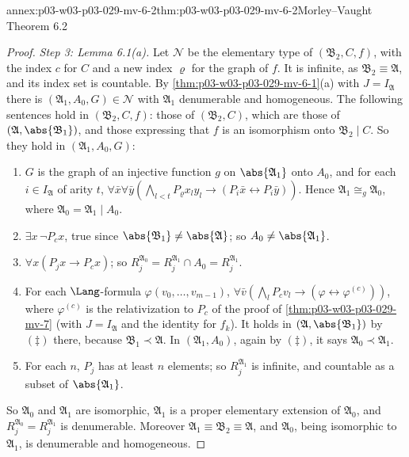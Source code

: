 \begin{annexitem}{annex:p03-w03-p03-029-mv-6-2}{thm:p03-w03-p03-029-mv-6-2}{Morley--Vaught Theorem 6.2}
\begin{proof}
\emph{Step 3: Lemma 6.1(a).} Let \(\mathscr N\) be the elementary type of
\((\mathfrak B_2,C,f)\), with the index \(c\) for \(C\) and a new index
\(\varrho\) for the graph of \(f\). It is infinite, as \(\mathfrak B_2\equiv\mathfrak
A\), and its index set is countable. By
\cref{thm:p03-w03-p03-029-mv-6-1}(a) with \(J=I_{\mathfrak A}\) there is
\((\mathfrak A_1,A_0,G)\in\mathscr N\) with \(\mathfrak A_1\) denumerable
and homogeneous. The following sentences hold in \((\mathfrak B_2,C,f)\):
those of \((\mathfrak B_2,C)\), which are those of \((\mathfrak
A,\abs{\mathfrak B_1})\), and those expressing that \(f\) is an isomorphism
onto \(\mathfrak B_2\mathbin{|}C\). So they hold in \((\mathfrak
A_1,A_0,G)\):
\begin{enumerate}
  \item[(s1)] \(G\) is the graph of an injective function \(g\) on
        \(\abs{\mathfrak A_1}\) onto \(A_0\), and for each \(i\in
        I_{\mathfrak A}\) of arity \(t\),
        \(\forall\bar x\forall\bar y(\bigwedge_{l<t}P_\varrho x_ly_l\to(P_i\bar
        x\leftrightarrow P_i\bar y))\). Hence \(\mathfrak A_1\cong_g\mathfrak
        A_0\), where \(\mathfrak A_0=\mathfrak A_1\mathbin{|}A_0\).
  \item[(s2)] \(\exists x\,\neg P_cx\), true since \(\abs{\mathfrak
        B_1}\neq\abs{\mathfrak A}\); so \(A_0\neq\abs{\mathfrak A_1}\).
  \item[(s3)] \(\forall x(P_jx\to P_cx)\); so \(R_j^{\mathfrak
        A_0}=R_j^{\mathfrak A_1}\cap A_0=R_j^{\mathfrak A_1}\).
  \item[(s4)] For each \(\Lang\)-formula \(\varphi(v_0,\ldots,v_{m-1})\),
        \(\forall\bar v(\bigwedge_lP_cv_l\to(\varphi\leftrightarrow\varphi^{(c)}))\),
        where \(\varphi^{(c)}\) is the relativization to \(P_c\) of the proof
        of \cref{thm:p03-w03-p03-029-mv-7} (with \(J=I_{\mathfrak A}\) and
        the identity for \(f_k\)). It holds in \((\mathfrak A,\abs{\mathfrak
        B_1})\) by \((\ddagger)\) there, because \(\mathfrak
        B_1\prec\mathfrak A\). In \((\mathfrak A_1,A_0)\), again by
        \((\ddagger)\), it says \(\mathfrak A_0\prec\mathfrak A_1\).
  \item[(s5)] For each \(n\), \(P_j\) has at least \(n\) elements; so
        \(R_j^{\mathfrak A_1}\) is infinite, and countable as a subset of
        \(\abs{\mathfrak A_1}\).
\end{enumerate}
So \(\mathfrak A_0\) and \(\mathfrak A_1\) are isomorphic, \(\mathfrak A_1\)
is a proper elementary extension of \(\mathfrak A_0\), and
\(R_j^{\mathfrak A_0}=R_j^{\mathfrak A_1}\) is denumerable. Moreover
\(\mathfrak A_1\equiv\mathfrak B_2\equiv\mathfrak A\), and \(\mathfrak A_0\),
being isomorphic to \(\mathfrak A_1\), is denumerable and homogeneous.


\end{proof}
\end{annexitem}
